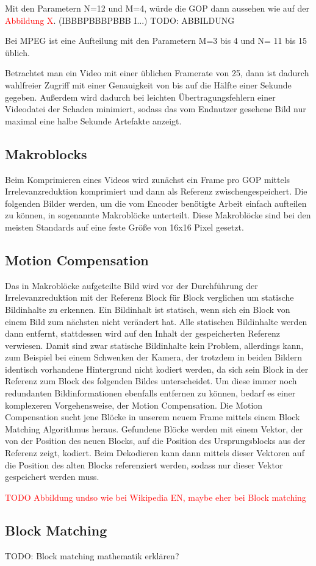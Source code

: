 Mit den Parametern N=12 und M=4, würde die GOP dann aussehen wie auf der \textcolor{red}{Abbildung X}. (IBBBPBBBPBBB I...) TODO: ABBILDUNG 

Bei MPEG ist eine Aufteilung mit den Parametern M=3 bis 4 und N= 11 bis 15 üblich.

Betrachtet man ein Video mit einer üblichen Framerate von 25, dann ist dadurch wahlfreier Zugriff mit einer Genauigkeit von bis auf die Hälfte einer Sekunde gegeben. Außerdem wird dadurch bei leichten Übertragungsfehlern einer Videodatei der Schaden minimiert, sodass das vom Endnutzer gesehene Bild nur maximal eine halbe Sekunde Artefakte anzeigt.

\subsection{Makroblocks}

Beim Komprimieren eines Videos wird zunächst ein Frame pro GOP mittels Irrelevanzreduktion komprimiert und dann als Referenz zwischengespeichert. Die folgenden Bilder werden, um die vom Encoder benötigte Arbeit einfach aufteilen zu können, in sogenannte Makroblöcke unterteilt. Diese Makroblöcke sind bei den meisten Standards auf eine feste Größe von 16x16 Pixel gesetzt. 

\subsection{Motion Compensation}

Das in Makroblöcke aufgeteilte Bild wird vor der Durchführung der Irrelevanzreduktion mit der Referenz Block für Block verglichen um statische Bildinhalte zu erkennen. Ein Bildinhalt ist statisch, wenn sich ein Block von einem Bild zum nächsten nicht verändert hat. Alle statischen Bildinhalte werden dann entfernt, stattdessen wird auf den Inhalt der gespeicherten Referenz verwiesen. 
Damit sind zwar statische Bildinhalte kein Problem, allerdings kann, zum Beispiel bei einem Schwenken der Kamera, der trotzdem in beiden Bildern identisch vorhandene Hintergrund nicht kodiert werden, da sich sein Block in der Referenz zum Block des folgenden Bildes unterscheidet. Um diese immer noch redundanten Bildinformationen ebenfalls entfernen zu können, bedarf es einer komplexeren Vorgehensweise, der Motion Compensation.
Die Motion Compensation sucht jene Blöcke in unserem neuem Frame mittels einem Block Matching Algorithmus heraus. Gefundene Blöcke werden mit einem Vektor, der von der Position des neuen Blocks, auf die Position des Ursprungsblocks aus der Referenz zeigt, kodiert. Beim Dekodieren kann dann mittels dieser Vektoren auf die Position des alten Blocks referenziert werden, sodass nur dieser Vektor gespeichert werden muss.

\textcolor{red}{TODO Abbildung undso wie bei Wikipedia EN, maybe eher bei Block matching}

\subsection{Block Matching}

TODO: Block matching mathematik erklären?